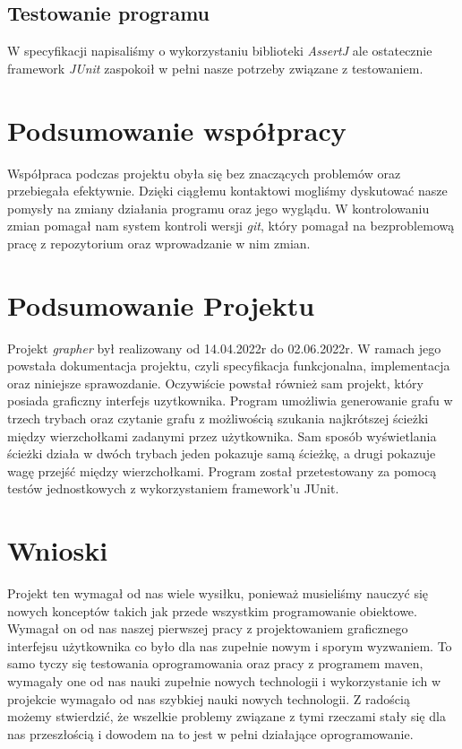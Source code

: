 \documentclass[10pt, a4paper]{report}
\begin{document}
\subsection{Testowanie programu}\label{subsec:testowanie-programu}
W specyfikacji napisaliśmy o wykorzystaniu biblioteki \textit{AssertJ} ale ostatecznie framework \textit{JUnit} zaspokoił w pełni nasze potrzeby związane z testowaniem.

\section{Podsumowanie współpracy}\label{sec:podsumowanie-współpracy}
Współpraca podczas projektu obyła się bez znaczących problemów oraz przebiegała efektywnie.
Dzięki ciągłemu kontaktowi mogliśmy dyskutować nasze pomysły na zmiany działania programu oraz jego wyglądu.
W kontrolowaniu zmian pomagał nam system kontroli wersji \textit{git}, który pomagał na bezproblemową pracę z repozytorium oraz wprowadzanie w nim zmian.

\section{Podsumowanie Projektu}\label{sec:podsumowanie-projektu}
Projekt \textit{grapher} był realizowany od 14.04.2022r do 02.06.2022r. W ramach jego powstała dokumentacja projektu, czyli
specyfikacja funkcjonalna, implementacja oraz niniejsze sprawozdanie. Oczywiście powstał również sam projekt, który posiada graficzny interfejs uzytkownika.
Program umożliwia generowanie grafu w trzech trybach oraz czytanie grafu z możliwością szukania najkrótszej ścieżki między wierzchołkami zadanymi przez użytkownika.
Sam sposób wyświetlania ścieżki działa w dwóch trybach jeden pokazuje samą ścieżkę, a drugi pokazuje wagę przejść między wierzchołkami. Program został przetestowany za pomocą testów
jednostkowych z wykorzystaniem framework'u JUnit.

\section{Wnioski}\label{sec:wnioski}
Projekt ten wymagał od nas wiele wysiłku, ponieważ musieliśmy nauczyć się nowych konceptów takich jak przede wszystkim
programowanie obiektowe. Wymagał on od nas naszej pierwszej pracy z projektowaniem graficznego interfejsu użytkownika co było dla nas zupełnie nowym i sporym wyzwaniem.
To samo tyczy się testowania oprogramowania oraz pracy z programem maven, wymagały one od nas nauki zupełnie nowych technologii i wykorzystanie ich w projekcie wymagało od nas
szybkiej nauki nowych technologii. Z radością możemy stwierdzić, że wszelkie problemy związane z tymi rzeczami stały się dla nas przeszłością i dowodem na to jest w pełni działające
oprogramowanie.
\end{document}
